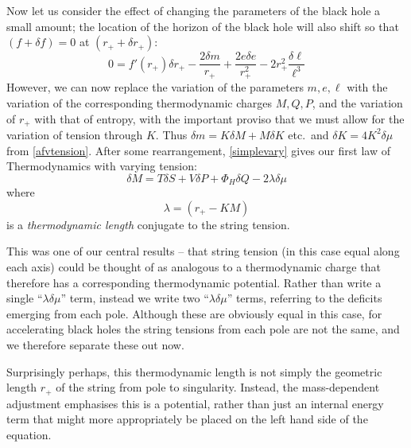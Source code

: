 \documentclass[
twoside,openright,frontopenright]{dmathesis}
\begin{document}
Now let us consider the effect of changing the parameters of the black hole
a small amount; the location of the horizon of the black hole will also shift
so that $(f+\delta f)= 0$ at $(r_++\delta r_+) $:
\begin{equation}
0= f'(r_+) \delta r_+ - \frac{2\delta m}{r_+} 
+ \frac{2e\delta e}{r_+^2}  - 2r_+^2 \frac{\delta \ell}{\ell^3}
\label{simplevary}
\end{equation}
However, we can now replace the variation of the parameters
$m, e, \ell$ with the variation of the corresponding thermodynamic charges
$M,Q,P$, and the variation of $r_+$ with that of entropy,
with the important proviso that we must allow for the variation
of tension through $K$. Thus $\delta m = K \delta M + M \delta K$ etc.\
and $\delta K = 4K^2\delta \mu$ from \eqref{afvtension}.
After some rearrangement, \eqref{simplevary} gives our  
first law of Thermodynamics with varying tension:
\begin{equation}
\delta M = T \delta S + V \delta P + \Phi_H \delta Q
-2 \lambda \delta\mu
\label{firstlawwithK}
\end{equation}
where
\begin{equation} 
\lambda = \left ( r_+ - KM  \right)
\label{TDlengthnoacc}
\end{equation}
is a \emph{thermodynamic length} conjugate to the string tension.

This was one of our central results -- that string tension (in this case
equal along each axis) could be thought of as analogous to a thermodynamic 
charge that therefore has a corresponding thermodynamic potential. 
Rather than write a single ``$\lambda\delta\mu$'' term, instead we write
two ``$\lambda\delta\mu$'' terms, referring to the deficits emerging from each
pole. Although these are obviously equal in this case, for 
accelerating black holes the string tensions from
each pole are not the same, and we therefore separate these out now.

Surprisingly perhaps, this thermodynamic length is not simply the 
geometric length $r_+$ of the string from pole to singularity. 
Instead, the mass-dependent adjustment
emphasises this is a potential, rather than just an internal energy
term that might more appropriately be placed on the left hand side
of the equation. 
\end{document}
